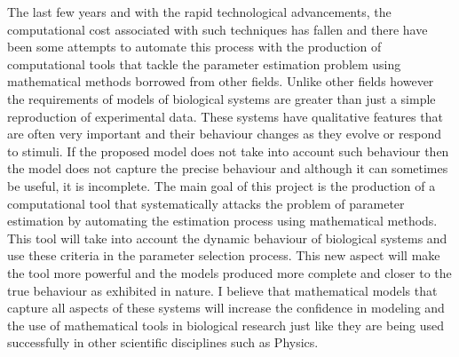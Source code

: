 \documentclass[12pt,a4paper,titlepage]{article}
\begin{document}
The last few years and with the rapid technological advancements, the computational cost associated with such techniques has fallen and there have been some attempts to automate this process with the production of computational tools that tackle the parameter estimation problem using mathematical methods borrowed from other fields. Unlike other fields however the requirements of models of biological systems are greater than just a simple reproduction of experimental data. These systems have qualitative features that are often very important and their behaviour changes as they evolve or respond to stimuli. If the proposed model does not take into account such behaviour then the model does not capture the precise behaviour and although it can sometimes be useful,  it is incomplete. The main goal of this project is the production of a computational tool that systematically attacks the problem of parameter estimation by automating the estimation process using mathematical methods. This tool will take into account the dynamic behaviour of biological systems and use these criteria in the parameter selection process. This new aspect will make the tool more powerful and the models produced more complete and closer to the true behaviour as exhibited in nature. I believe that mathematical models that capture all aspects of these systems will increase the confidence in modeling and the use of mathematical tools in biological research just like they are being used successfully in other scientific disciplines such as Physics.
\end{document}
